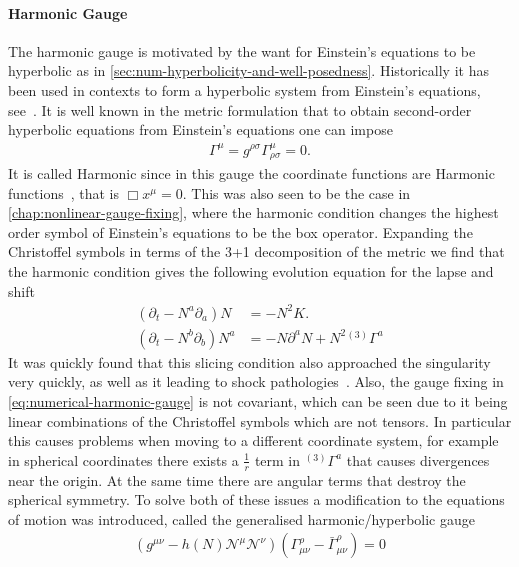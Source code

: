 \documentclass[10pt]{report}
\theoremstyle{definition}
\newcommand{\N}[0]{\mathcal{N}}
\begin{document}
\paragraph{Harmonic Gauge}
The harmonic gauge is motivated by the want for Einstein's equations to be hyperbolic as in \cref{sec:num-hyperbolicity-and-well-posedness}. Historically it has been used in contexts to form a hyperbolic system from Einstein's equations, see~\cite{Hyperb1+3YvonneTommaso1983,Numerical_Relat_Pretor_2004}. It is well known in the metric formulation that to obtain second-order hyperbolic equations from Einstein's equations one can impose 
\begin{align}
    \Gamma^\mu = g^{\rho\sigma} \Gamma^\mu_{\rho\sigma} = 0. \label{eq:numerical-harmonic-gauge}
\end{align}
It is called Harmonic since in this gauge the coordinate functions are Harmonic functions~\cite{Besse1987}, that is $\Box x^\mu = 0$. This was also seen to be the case in \cref{chap:nonlinear-gauge-fixing}, where the harmonic condition changes the highest order symbol of Einstein's equations to be the box operator. Expanding the Christoffel symbols in terms of the 3+1 decomposition of the metric we find that the harmonic condition gives the following evolution equation for the lapse and shift
\begin{align}
    (\partial_t - N^a \partial_a) N &= -N^2 K. \label{eq:num-lapse-harmonic-slicing} \\
    (\partial_t - N^b \partial_b) N^a &= - N \partial^a N + N^2 {}^{(3)} \Gamma^a
\end{align}
It was quickly found that this slicing condition also approached the singularity very quickly, as well as it leading to shock pathologies~\cite{Pathologies_of_Alcubi_1997}. Also, the gauge fixing in \cref{eq:numerical-harmonic-gauge} is not covariant, which can be seen due to it being linear combinations of the Christoffel symbols which are not tensors. In particular this causes problems when moving to a different coordinate system, for example in spherical coordinates there exists a $\frac{1}{r}$ term in ${}^{(3)} \Gamma^a$ that causes divergences near the origin.  At the same time there are angular terms that destroy the spherical symmetry. To solve both of these issues a modification to the equations of motion was introduced, called the generalised harmonic/hyperbolic gauge
\begin{align}
    (g^{\mu\nu} - h(N) \N^\mu \N^\nu) \left(\Gamma^\rho_{\mu\nu} - \bar{\Gamma}^\rho_{\mu\nu}\right) = 0
\end{align}
\end{document}
